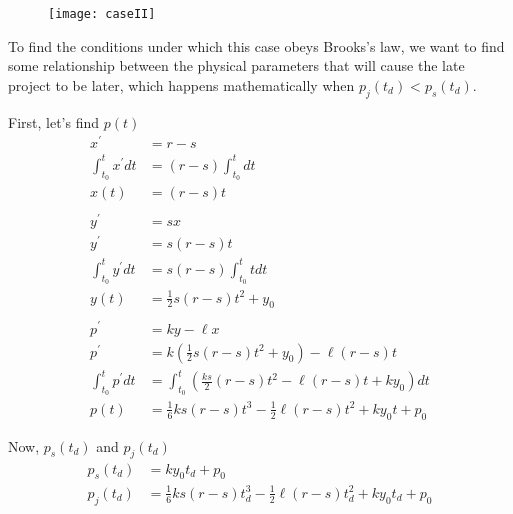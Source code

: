 \documentclass{article}
\newenvironment{atomize}
    {\begin{list} {} {
            \setlength\itemindent{0pt}
            \setlength\leftmargin{10pt}
            \setlength\labelwidth{0pt}
    }}
    {\end{list}}
\begin{document}
\begin{atomize}
\begin{atomize}
        \item 
          \begin{figure}[H]
            \centering
            \texttt{[image: caseII]}
          \end{figure}

        \item To find the conditions under which this case obeys Brooks's law,
        we want to find some relationship between the physical
        parameters that will cause the late project to be later, which
        happens mathematically when $p_{j}(t_{d}) < p_{s}(t_{d})$.

        \item First, let's find $p(t)$
          \begin{align*}
            x^{\prime} &= r - s \\[6pt]
            \int^{t}_{t_{0}} x^{\prime} dt &= (r - s)\int^{t}_{t_{0}}dt \\[6pt]
            x(t) &= (r - s)t \\[6pt]
            \\[3pt]
            y^{\prime} &= sx \\[6pt]
            y^{\prime} &= s(r - s)t \\[6pt]
            \int^{t}_{t_{0}} y^{\prime} dt &= s(r - s)\int^{t}_{t_{0}} t dt
            \\[6pt]
            y(t) &= \frac{1}{2}s(r - s)t^{2} + y_{0}\\[6pt]
            \\[3pt]
            p^{\prime} &= ky - {\ell}x \\[6pt]
            p^{\prime} &= k\left(\frac{1}{2}s(r - s)t^{2} + y_{0}\right) 
            - \ell(r - s)t \\[6pt]
            \int^{t}_{t_{0}} p^{\prime} dt &= \int^{t}_{t_{0}}
            \left(\frac{ks}{2}(r - s)t^{2} - \ell(r - s)t + ky_{0}\right)
            dt \\[6pt]
            p(t) &= \frac{1}{6}ks(r - s)t^{3} - \frac{1}{2}\ell(r - s)t^{2} 
            + ky_{0}t  + p_{0}
          \end{align*}

        \item Now, $p_{s}(t_{d})$ and $p_{j}(t_{d})$
          \begin{align*}
            p_{s}(t_{d}) &= ky_{0}t_{d}  + p_{0} \\[6pt]
            p_{j}(t_{d}) &= \frac{1}{6}ks(r - s)t_{d}^{3} 
            - \frac{1}{2}\ell(r - s)t_{d}^{2} + ky_{0}t_{d}  + p_{0}
          \end{align*}


\end{atomize}
\end{atomize}
\end{document}
